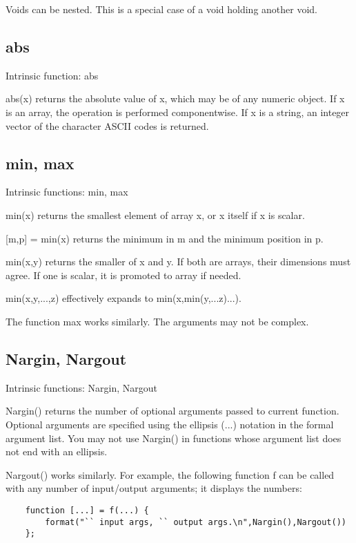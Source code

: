 \documentclass[a4paper]{article}
\begin{document}
Voids can be nested.  This is a special case of a void holding another
void.




\subsection{abs\label{abs}}

Intrinsic function: abs

abs(x) returns the absolute value of x, which may be of any numeric
object.  If x is an array, the operation is performed componentwise.
If x is a string, an integer vector of the character ASCII codes
is returned.




\subsection{min, max\label{min}}

Intrinsic functions: min, max

min(x) returns the smallest element of array x, or x itself if x is
scalar.

{[}m,p] = min(x) returns the minimum in m and the minimum position in p.

min(x,y) returns the smaller of x and y. If both are arrays, their
dimensions must agree. If one is scalar, it is promoted to array if
needed.

min(x,y,...,z) effectively expands to min(x,min(y,...z)...).

The function max works similarly. The arguments may not be complex.




\subsection{Nargin, Nargout\label{Nargin}}

Intrinsic functions: Nargin, Nargout

Nargin() returns the number of optional arguments passed to current
function.  Optional arguments are specified using the ellipsis (...)
notation in the formal argument list. You may not use Nargin() in
functions whose argument list does not end with an ellipsis.

Nargout() works similarly. For example, the following function f can
be called with any number of input/output arguments; it displays the
numbers:

\begin{tscreen}
\begin{verbatim}
    function [...] = f(...) {
        format("`` input args, `` output args.\n",Nargin(),Nargout())
    };
\end{verbatim}
\end{tscreen}
\end{document}
